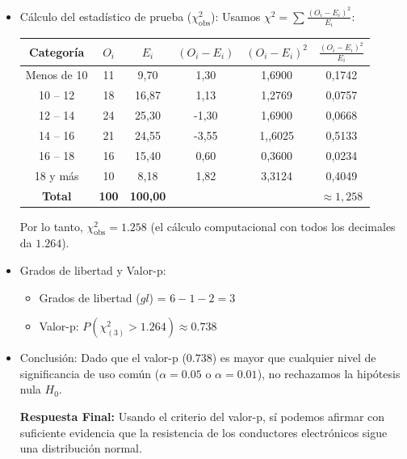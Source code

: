 \documentclass[12pt,a4paper]{article}
\begin{document}
\begin{itemize}
        \item [4)] Cálculo del estadístico de prueba ($\chi^2_{\text{obs}}$):
        Usamos $\chi^2 = \sum \frac{(O_i - E_i)^2}{E_i}$:
        
        \begin{center}
            \begin{tabular}{cccccc}
                \toprule
                Categoría & $O_i$ & $E_i$ & $(O_i - E_i)$ & $(O_i - E_i)^2$ & $\frac{(O_i - E_i)^2}{E_i}$ \\
                \midrule
                Menos de 10 & 11 & 9,70  & 1,30  & 1,6900 & 0,1742 \\
                10 -- 12    & 18 & 16,87 & 1,13  & 1,2769 & 0,0757 \\
                12 -- 14    & 24 & 25,30 & -1,30 & 1,6900 & 0,0668 \\
                14 -- 16    & 21 & 24,55 & -3,55 & 1,,6025& 0,5133 \\
                16 -- 18    & 16 & 15,40 & 0,60  & 0,3600 & 0,0234 \\
                18 y más    & 10 & 8,18  & 1,82  & 3,3124 & 0,4049 \\
                \midrule
                \textbf{Total} & \textbf{100} & \textbf{100,00} & & & \textbf{$\approx 1,258$} \\
                \bottomrule
            \end{tabular}
        \end{center}
        Por lo tanto, $\chi^2_{\text{obs}} = 1.258$ (el cálculo computacional con todos los decimales da $1.264$).

        \item [5)] Grados de libertad y Valor-p:
        \begin{itemize}
            \item Grados de libertad ($gl$) = $6 - 1 - 2 = 3$
            \item Valor-p: $P(\chi^2_{(3)} > 1.264) \approx 0.738$
        \end{itemize}
        
        \item [6)] Conclusión:
        Dado que el valor-p ($0.738$) es mayor que cualquier nivel de significancia de uso común ($\alpha = 0.05$ o $\alpha = 0.01$), no rechazamos la hipótesis nula $H_0$.
        \vspace{0.5cm}
        
        \noindent\textbf{Respuesta Final:} Usando el criterio del valor-p, sí podemos afirmar con suficiente evidencia que la resistencia de los conductores electrónicos sigue una distribución normal.
\end{itemize}
\end{document}
